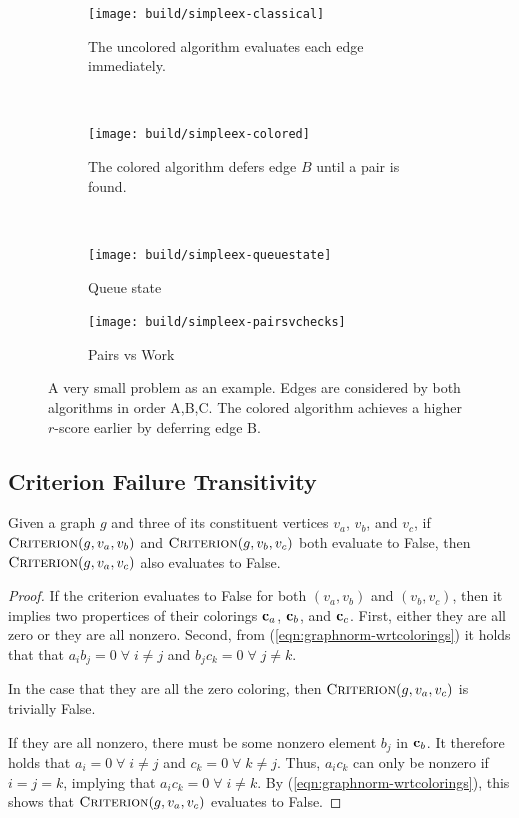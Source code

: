 \begin{figure}[t]
\begin{subfigure}[b]{\linewidth}
\centering
\texttt{[image: build/simpleex-classical]}
\caption{The uncolored algorithm evaluates each edge immediately.}
\end{subfigure}
\vspace{0.00001in}\\
\begin{subfigure}[b]{\linewidth}
\centering
\texttt{[image: build/simpleex-colored]}
\caption{The colored algorithm defers edge $B$ until a pair is found.}
\end{subfigure}
\vspace{0.00001in}\\
\begin{subfigure}[b]{0.49\linewidth}
\centering
\texttt{[image: build/simpleex-queuestate]}
\caption{Queue state}
\label{subfig:results}
\end{subfigure}
\begin{subfigure}[b]{0.49\linewidth}
\centering
\texttt{[image: build/simpleex-pairsvchecks]}
\caption{Pairs vs Work}
\end{subfigure}
\caption{A very small problem as an example.
   Edges are considered by both algorithms in order A,B,C.
   The colored algorithm achieves a higher $r$-score earlier
   by deferring edge B.}
\label{fig:simple-example}
\end{figure}

\subsection{Criterion Failure Transitivity}

\begin{lemma}
Given a graph $g$ and three of its constituent vertices
$v_a$, $v_b$, and $v_c$,
if $\textsc{Criterion}(g, v_a, v_b)$
and $\textsc{Criterion}(g, v_b, v_c)$ both evaluate to False,
then $\textsc{Criterion}(g, v_a, v_c)$ also evaluates to False.
\label{lem:failure-transitivity}
\end{lemma}

\begin{proof}
If the criterion evaluates to False for both
$(v_a,v_b)$ and $(v_b,v_c)$,
then it implies two propertices of their colorings
${\bf c}_a$, ${\bf c}_b$, and ${\bf c}_c$.
First, either they are all zero or they are all nonzero.
Second, from (\ref{eqn:graphnorm-wrtcolorings}) it holds that
that $a_i b_j = 0 \;\forall\; i \neq j$
and $b_j c_k = 0 \;\forall\; j \neq k$.

In the case that they are all the zero coloring,
then $\textsc{Criterion}(g, v_a, v_c)$ is trivially False.

If they are all nonzero,
there must be some nonzero element $b_j$ in ${\bf c}_b$.
It therefore holds that
$a_i = 0 \;\forall\; i \neq j$
and $c_k = 0 \;\forall\; k \neq j$.
Thus, $a_i c_k$ can only be nonzero if $i=j=k$,
implying that $a_i c_k = 0 \;\forall\; i \neq k$.
By (\ref{eqn:graphnorm-wrtcolorings}),
this shows that $\textsc{Criterion}(g, v_a, v_c)$
evaluates to False.
\end{proof}

